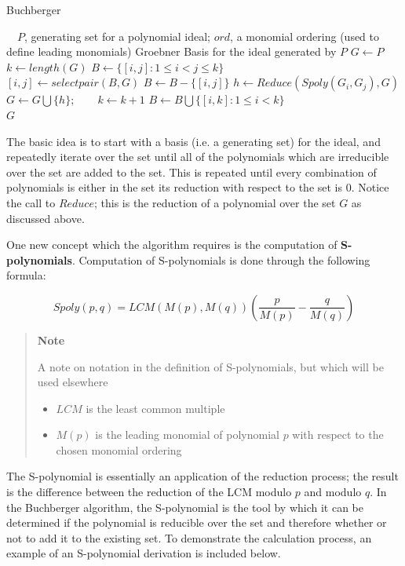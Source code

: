 \documentclass[letterpaper,12pt,titlepage,oneside,final]{book}
\newcounter{notecounter}
\newenvironment{note}{\begin{quote}%
    \refstepcounter{notecounter}%
  \textbf{Note \arabic{notecounter}}%
  \quad
}{%
\end{quote}%
}
\begin{document}
\begin{algorithm}[H]
\caption{Buchberger}\label{buchberger}
\begin{algorithmic}[1]
\Input $\quad P$, generating set for a polynomial ideal; $ord$, a monomial ordering (used to define leading monomials)
\Output Groebner Basis for the ideal generated by $P$
\State $G \gets P$
\State $k \gets length( G)$
\State $B \gets \{[i, j] : 1 \leq i < j \leq k\}$\\
  \State $[i, j] \gets selectpair( B, G)$
  \State $B \gets B - \{[i, j]\}$
  \State $h \gets Reduce( Spoly( G_i, G_j), G)$
    \State $G \gets G \bigcup \{h\}; \qquad k \gets k + 1$
    \State $B \gets B \bigcup \{[i, k] : 1 \leq i < k\}$
  \EndIf
\EndWhile\\
\Return $G$
\EndProcedure
\end{algorithmic}
\end{algorithm}  

The basic idea is to start with a basis (i.e. a generating set) for the ideal, and repeatedly iterate over the set until all of the polynomials which are irreducible over the set are added to the set.  This is repeated until every combination of polynomials is either in the set its reduction with respect to the set is 0.  Notice the call to ${Reduce}$; this is the reduction of a polynomial over the set ${G}$ as discussed above.   

One new concept which the algorithm requires is the computation of \textbf{S-polynomials}.  Computation of S-polynomials is done through the following formula: 

\begin{equation*}
  Spoly( p, q) = LCM(M(p), M(q)) \left( \frac{p}{M(p)} - \frac{q}{M(q)}\right)
\end{equation*}

\begin{note}
  A note on notation in the definition of S-polynomials, but which will be used elsewhere
  \begin{itemize}
    \item ${LCM}$ is the least common multiple
    \item ${M(p)}$ is the leading monomial of polynomial ${p}$ with respect to the chosen monomial ordering 
  \end{itemize}
\end{note}

The S-polynomial is essentially an application of the reduction process; the result is the difference between the reduction of the LCM modulo ${p}$ and modulo ${q}$.  In the Buchberger algorithm, the S-polynomial is the tool by which it can be determined if the polynomial is reducible over the set and therefore whether or not to add it to the existing set.  To demonstrate the calculation process, an example of an S-polynomial derivation is included below.
\end{document}
